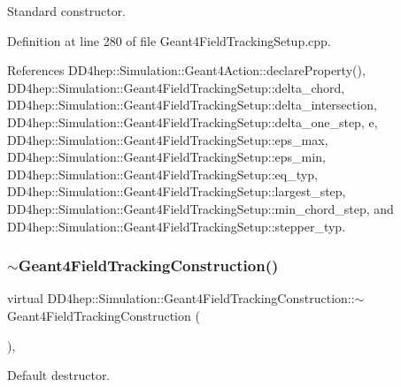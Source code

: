 Standard constructor. 



Definition at line 280 of file Geant4\+Field\+Tracking\+Setup.\+cpp.



References D\+D4hep\+::\+Simulation\+::\+Geant4\+Action\+::declare\+Property(), D\+D4hep\+::\+Simulation\+::\+Geant4\+Field\+Tracking\+Setup\+::delta\+\_\+chord, D\+D4hep\+::\+Simulation\+::\+Geant4\+Field\+Tracking\+Setup\+::delta\+\_\+intersection, D\+D4hep\+::\+Simulation\+::\+Geant4\+Field\+Tracking\+Setup\+::delta\+\_\+one\+\_\+step, e, D\+D4hep\+::\+Simulation\+::\+Geant4\+Field\+Tracking\+Setup\+::eps\+\_\+max, D\+D4hep\+::\+Simulation\+::\+Geant4\+Field\+Tracking\+Setup\+::eps\+\_\+min, D\+D4hep\+::\+Simulation\+::\+Geant4\+Field\+Tracking\+Setup\+::eq\+\_\+typ, D\+D4hep\+::\+Simulation\+::\+Geant4\+Field\+Tracking\+Setup\+::largest\+\_\+step, D\+D4hep\+::\+Simulation\+::\+Geant4\+Field\+Tracking\+Setup\+::min\+\_\+chord\+\_\+step, and D\+D4hep\+::\+Simulation\+::\+Geant4\+Field\+Tracking\+Setup\+::stepper\+\_\+typ.

\hypertarget{class_d_d4hep_1_1_simulation_1_1_geant4_field_tracking_construction_a3c5e7faf98ffa659094ac4f18dd5d1e2}{}\label{class_d_d4hep_1_1_simulation_1_1_geant4_field_tracking_construction_a3c5e7faf98ffa659094ac4f18dd5d1e2} 
\subsubsection{\texorpdfstring{$\sim$\+Geant4\+Field\+Tracking\+Construction()}{~Geant4FieldTrackingConstruction()}}
{\footnotesize\ttfamily virtual D\+D4hep\+::\+Simulation\+::\+Geant4\+Field\+Tracking\+Construction\+::$\sim$\+Geant4\+Field\+Tracking\+Construction (\begin{DoxyParamCaption}{ }\end{DoxyParamCaption})\hspace{0.3cm}{\ttfamily [inline]}, {\ttfamily [virtual]}}



Default destructor. 



